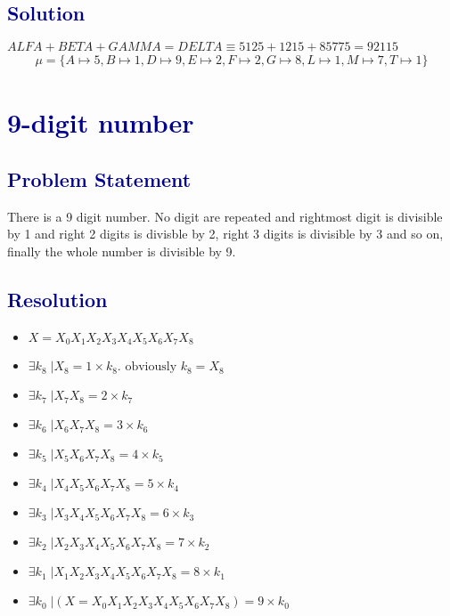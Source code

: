 \documentclass[12pt]{article}
\theoremstyle{definition}
\theoremstyle{plain}
\begin{document}
\subsection*{\textcolor{darkblue}{Solution}}
$ALFA + BETA + GAMMA = DELTA \equiv 5125 + 1215 + 85775 = 92115$
\[
\boxed{\begin{aligned}
\mu = \{A \mapsto 5, B \mapsto 1, D \mapsto 9, E \mapsto 2, F \mapsto 2, G \mapsto 8, L \mapsto 1, M \mapsto 7, T \mapsto 1 \}
\end{aligned}}
\]

\section*{\textcolor{darkblue}{9-digit number}}
\subsection*{\textcolor{darkblue}{Problem Statement}}

\vspace{0.5cm}
\begin{tcolorbox}[colback=lightgray, colframe=darkblue, boxrule=1pt]
There is a 9 digit number. No digit are repeated and rightmost digit is divisible by 1 and right 2 digits is divisble by 2, right 3 digits is divisible by 3 and so on, finally the whole number is divisible by 9.
\end{tcolorbox}
\subsection*{\textcolor{darkblue}{Resolution}}
\begin{itemize}
  \item$X = X_0X_1X_2X_3X_4X_5X_6X_7X_8$
  \item $ \exists k_8 \;| X_8 = 1 \times k_8. \text{ obviously } k_8 = X_8$
  \item $\exists k_7 \;| X_7X_8 = 2 \times k_7 $
  \item $\exists k_6 \;| X_6X_7X_8 = 3 \times k_6$
  \item $\exists k_5 \;| X_5X_6X_7X_8 = 4 \times k_5$
  \item $\exists k_4 \;| X_4X_5X_6X_7X_8 = 5 \times k_4$
  \item $\exists k_3 \;| X_3X_4X_5X_6X_7X_8 = 6 \times k_3$
  \item $\exists k_2 \; | X_2X_3X_4X_5X_6X_7X_8 = 7 \times k_2$
  \item $\exists k_1 \; | X_1X_2X_3X_4X_5X_6X_7X_8 = 8 \times k_1$
  \item $\exists k_0 \;| (X = X_0X_1X_2X_3X_4X_5X_6X_7X_8) = 9 \times k_0$
\end{itemize}
\end{document}
